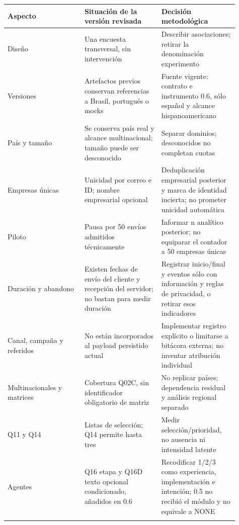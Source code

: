 \documentclass[12pt,letterpaper]{article}
\begin{document}
\begingroup\small{}\setlength{\tabcolsep}{4pt}\begin{longtable}{>{\raggedright\arraybackslash}p{0.303\linewidth}>{\raggedright\arraybackslash}p{0.303\linewidth}>{\raggedright\arraybackslash}p{0.303\linewidth}}
\toprule
\textbf{Aspecto} & \textbf{Situación de la versión revisada} & \textbf{Decisión metodológica} \\ \midrule\endhead
Diseño & Una encuesta transversal, sin intervención & Describir asociaciones; retirar la denominación experimento \\ \addlinespace[5pt]
Versiones & Artefactos previos conservan referencias a Brasil, portugués o mocks & Fuente vigente: contrato e instrumento 0.6, sólo español y alcance hispanoamericano \\ \addlinespace[5pt]
País y tamaño & Se conserva país real y alcance multinacional; tamaño puede ser desconocido & Separar dominios; desconocidos no completan cuotas \\ \addlinespace[5pt]
Empresas únicas & Unicidad por correo e ID; nombre empresarial opcional & Deduplicación empresarial posterior y marca de identidad incierta; no prometer unicidad automática \\ \addlinespace[5pt]
Piloto & Pausa por 50 envíos admitidos técnicamente & Informar n analítico posterior; no equiparar el contador a 50 empresas únicas \\ \addlinespace[5pt]
Duración y abandono & Existen fechas de envío del cliente y recepción del servidor; no bastan para medir duración & Registrar inicio/final y eventos sólo con información y reglas de privacidad, o retirar esos indicadores \\ \addlinespace[5pt]
Canal, campaña y referidos & No están incorporados al payload persistido actual & Implementar registro explícito o limitarse a bitácora externa; no inventar atribución individual \\ \addlinespace[5pt]
Multinacionales y matrices & Cobertura Q02C, sin identificador obligatorio de matriz & No replicar países; dependencia residual y análisis regional separado \\ \addlinespace[5pt]
Q11 y Q14 & Listas de selección; Q14 permite hasta tres & Medir selección/prioridad, no ausencia ni intensidad latente \\ \addlinespace[5pt]
Agentes & Q16 etapa y Q16D texto opcional condicionado, añadidos en 0.6 & Recodificar 1/2/3 como experiencia, implementación e intención; 0.5 no recibió el módulo y no equivale a NONE \\ \addlinespace[5pt]

\end{longtable}
\end{document}
